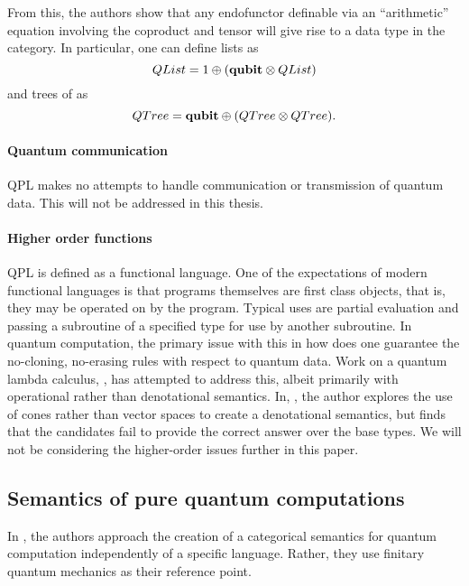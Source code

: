 From this, the authors show that any endofunctor definable via an ``arithmetic'' equation involving
the coproduct and tensor will give rise to a data type in the category. In particular, one can
define \qubit lists as \[QList = 1 \oplus (\mathbf{{qubit}} \otimes QList)\] and trees of \qbits as \[QTree =
\mathbf{{qubit}}\oplus(QTree \otimes QTree).\]

\paragraph{Quantum communication}
QPL makes no attempts to handle communication or transmission of quantum data. This will not be
addressed in this thesis.

\paragraph{Higher order functions}
QPL is defined as a functional language. One of the expectations of modern functional languages is
that programs themselves are first class objects, that is, they may be operated on by the program.
Typical uses are partial evaluation and passing a subroutine of a specified type for use by another
subroutine. In quantum computation, the primary issue with this in how does one guarantee the
no-cloning, no-erasing rules with respect to quantum data. Work on a quantum lambda calculus,
\cite{tonder03:qcsemantics,valiron:thesis}, has attempted to address this, albeit primarily with
operational rather than denotational semantics. In, \cite{selinger04:towardssemantics}, the author
explores the use of cones rather than vector spaces to create a denotational semantics, but finds
that the candidates fail to provide the correct answer over the base types. We will not be
considering the higher-order issues further in this paper.

\subsection{Semantics of pure quantum computations}\label{sec:puresemantics}
In \cite{abramsky04:catsemquantprot}, the authors approach the creation of a categorical semantics
for quantum computation independently of a specific language. Rather, they use finitary quantum
mechanics as their reference point.

